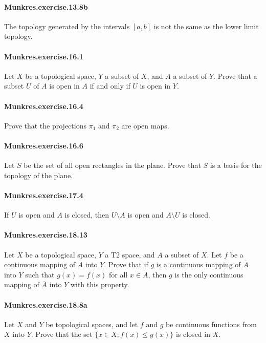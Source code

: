 \documentclass{article}
\begin{document}
\paragraph{Munkres.exercise.13.8b} The topology generated by the intervals $[a,b]$ is not the same as the lower limit topology.

\paragraph{Munkres.exercise.16.1} Let $X$ be a topological space, $Y$ a subset of $X$, and $A$ a subset of $Y$. Prove that a subset $U$ of $A$ is open in $A$ if and only if $U$ is open in $Y$.

\paragraph{Munkres.exercise.16.4} Prove that the projections $\pi_1$ and $\pi_2$ are open maps.

\paragraph{Munkres.exercise.16.6} Let $S$ be the set of all open rectangles in the plane. Prove that $S$ is a basis for the topology of the plane.

\paragraph{Munkres.exercise.17.4} If $U$ is open and $A$ is closed, then $U\setminus A$ is open and $A\setminus U$ is closed.

\paragraph{Munkres.exercise.18.13} Let $X$ be a topological space, $Y$ a T2 space, and $A$ a subset of $X$. Let $f$ be a continuous mapping of $A$ into $Y$. Prove that if $g$ is a continuous mapping of $\overline{A}$ into $Y$ such that $g(x)=f(x)$ for all $x \in A$, then $g$ is the only continuous mapping of $\overline{A}$ into $Y$ with this property.

\paragraph{Munkres.exercise.18.8a} Let $X$ and $Y$ be topological spaces, and let $f$ and $g$ be continuous functions from $X$ into $Y$. Prove that the set $\{x\in X: f(x)\leq g(x)\}$ is closed in $X$.
\end{document}
